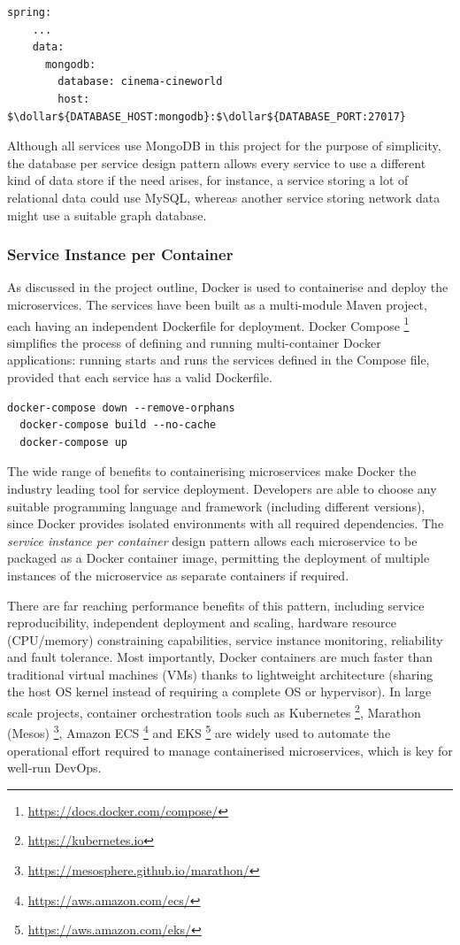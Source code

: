 \begin{lstlisting}[caption=Snippet from Cineworld cinema's application properties]
  spring:
    ...
    data:
      mongodb:
        database: cinema-cineworld
        host: $\dollar${DATABASE_HOST:mongodb}:$\dollar${DATABASE_PORT:27017}
\end{lstlisting}

Although all services use MongoDB in this project for the purpose of simplicity, the database per service design pattern allows every service to use a different kind of data store if the need arises, for instance, a service storing a lot of relational data could use MySQL, whereas another service storing network data might use a suitable graph database.

\subsubsection{Service Instance per Container}

As discussed in the project outline, Docker is used to containerise and deploy the microservices. The services have been built as a multi-module Maven project, each having an independent Dockerfile for deployment. Docker Compose \footnote{\url{https://docs.docker.com/compose/}} simplifies the process of defining and running multi-container Docker applications: running  starts and runs the services defined in the Compose file, provided that each service has a valid Dockerfile.

\begin{lstlisting}[caption=Sample Docker Compose commands to start the microservices]
  docker-compose down --remove-orphans
  docker-compose build --no-cache
  docker-compose up
\end{lstlisting}

The wide range of benefits to containerising microservices make Docker the industry leading tool for service deployment. Developers are able to choose any suitable programming language and framework (including different versions), since Docker provides isolated environments with all required dependencies. The \textit{service instance per container} design pattern allows each microservice to be packaged as a Docker container image, permitting the deployment of multiple instances of the microservice as separate containers if required.

There are far reaching performance benefits of this pattern, including service reproducibility, independent deployment and scaling, hardware resource (CPU/memory) constraining capabilities, service instance monitoring, reliability and fault tolerance. Most importantly, Docker containers are much faster than traditional virtual machines (VMs) thanks to lightweight architecture (sharing the host OS kernel instead of requiring a complete OS or hypervisor). In large scale projects, container orchestration tools such as Kubernetes \footnote{\url{https://kubernetes.io}}, Marathon (Mesos) \footnote{\url{https://mesosphere.github.io/marathon/}}, Amazon ECS \footnote{\url{https://aws.amazon.com/ecs/}} and EKS \footnote{\url{https://aws.amazon.com/eks/}} are widely used to automate the operational effort required to manage containerised microservices, which is key for well-run DevOps.

